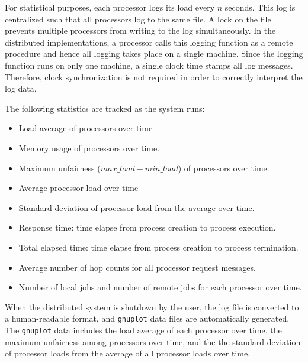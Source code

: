 \documentclass{report}
\begin{document}
For statistical purposes, each processor logs its load every $n$ seconds.
This log is centralized such that all processors log to the same file.  A
lock on the file prevents multiple processors from writing to the log
simultaneously.  In the distributed implementations, a processor calls this
logging function as a remote procedure and hence all logging takes place on
a single machine.  Since the logging function runs on only one machine, a
single clock time stamps all log messages.  Therefore, clock synchronization
is not required in order to correctly interpret the log data.

The following statistics are tracked as the system runs:

\begin{itemize}
	\item Load average of processors over time

	\item Memory usage of processors over time. 

	\item Maximum unfairness ($max\_load - min\_load$) of processors
	over time. 

	\item Average processor load over time

	\item Standard deviation of processor load from the average over
	time.

	\item Response time: time elapse from process creation to process
	execution.

	\item Total elapsed time: time elapse from process creation to
	process termination.

	\item Average number of hop counts for all processor request
	messages.

	\item Number of local jobs and number of remote jobs for each
	processor over time.

\end{itemize}

When the distributed system is shutdown by the user, the log file is
converted to a human-readable format, and \texttt{gnuplot} data files are
automatically generated.  The \texttt{gnuplot} data includes the load
average of each processor over time, the maximum unfairness among processors
over time, and the the standard deviation of processor loads from the
average of all processor loads over time.
\end{document}
